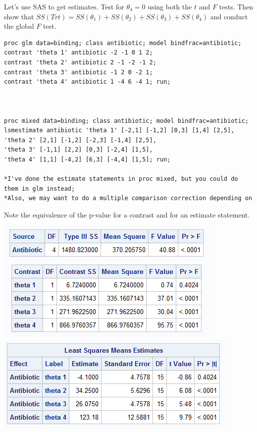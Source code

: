 \newpage

Let's use SAS to get estimates.  Test for $\theta_4=0$ using both the $t$ and $F$ tests.  Then show that $SS(Trt)=SS(\theta_1)+SS(\theta_2)+SS(\theta_3)+SS(\theta_4)$ and conduct the global $F$ test.\\
\begin{small}
\begin{verbatim}
proc glm data=binding; class antibiotic; model bindfrac=antibiotic;
contrast 'theta 1' antibiotic -2 -1 0 1 2;
contrast 'theta 2' antibiotic 2 -1 -2 -1 2;
contrast 'theta 3' antibiotic -1 2 0 -2 1;
contrast 'theta 4' antibiotic 1 -4 6 -4 1; run;



proc mixed data=binding; class antibiotic; model bindfrac=antibiotic;
lsmestimate antibiotic 'theta 1' [-2,1] [-1,2] [0,3] [1,4] [2,5],
'theta 2' [2,1] [-1,2] [-2,3] [-1,4] [2,5], 
'theta 3' [-1,1] [2,2] [0,3] [-2,4] [1,5], 
'theta 4' [1,1] [-4,2] [6,3] [-4,4] [1,5]; run;

*I've done the estimate statements in proc mixed, but you could do them in glm instead;
*Also, we may want to do a multiple comparison correction depending on 
\end{verbatim}
\end{small}
Note the equivalence of the p-value for a contrast and for an estimate statement.
\begin{flushleft}
\includegraphics[scale=0.75]{BindFracContrastSS}\\
\includegraphics[scale=0.7]{BindFracContrastMixed}
\end{flushleft}

